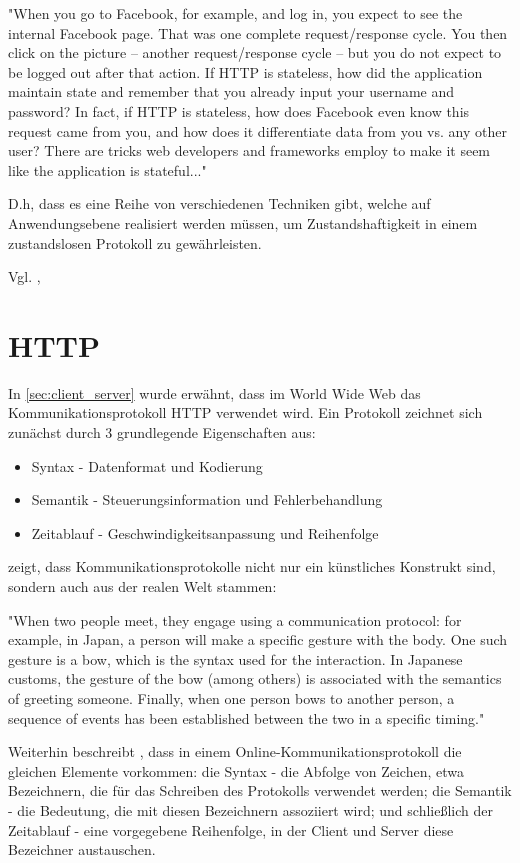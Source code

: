 "When you go to Facebook, for example, and log in, you expect to see the internal Facebook page. That was one complete request/response cycle. You then click on the picture -- another request/response cycle -- but you do not expect to be logged out after that action. If HTTP is stateless, how did the application maintain state and remember that you already input your username and password? In fact, if HTTP is stateless, how does Facebook even know this request came from you, and how does it differentiate data from you vs. any other user? There are tricks web developers and frameworks employ to make it seem like the application is stateful..."

D.h, dass es eine Reihe von verschiedenen Techniken gibt, welche auf Anwendungsebene realisiert werden müssen, um Zustandshaftigkeit in einem zustandslosen Protokoll zu gewährleisten.

Vgl. \cite[Background]{Parikh:2015}, \cite{Culloca:2006}

\section{HTTP}

In \ref{sec:client_server} wurde erwähnt, dass im World Wide Web das Kommunikationsprotokoll HTTP verwendet wird. Ein Protokoll zeichnet sich zunächst durch 3 grundlegende Eigenschaften aus:

\begin{itemize}
\item Syntax - Datenformat und Kodierung
\item Semantik - Steuerungsinformation und Fehlerbehandlung
\item Zeitablauf - Geschwindigkeitsanpassung und Reihenfolge
\end{itemize}

\cite{Dubost:2012} zeigt, dass Kommunikationsprotokolle nicht nur ein künstliches Konstrukt sind, sondern auch aus der realen Welt stammen:

"When two people meet, they engage using a communication protocol: for example, in Japan, a person will make a specific gesture with the body. One such gesture is a bow, which is the syntax used for the interaction. In Japanese customs, the gesture of the bow (among others) is associated with the semantics of greeting someone. Finally, when one person bows to another person, a sequence of events has been established between the two in a specific timing."

Weiterhin beschreibt \cite{Dubost:2012}, dass in einem Online-Kommunikationsprotokoll die gleichen Elemente vorkommen: die Syntax - die Abfolge von Zeichen, etwa Bezeichnern, die für das Schreiben des Protokolls verwendet werden; die Semantik - die Bedeutung, die mit diesen Bezeichnern assoziiert wird; und schließlich der Zeitablauf - eine vorgegebene Reihenfolge, in der Client und Server diese Bezeichner austauschen.

